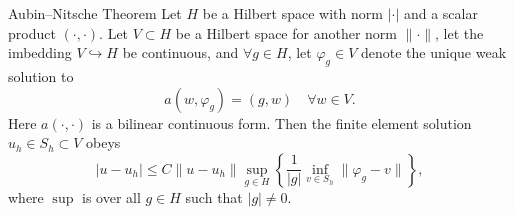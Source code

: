 \begin{thmx}{Aubin–Nitsche Theorem\label{thm:aubin-nitsche}}
    Let $H$ be a Hilbert space with norm $|\cdot|$ and a scalar product $(\cdot,\cdot)$.
    Let $V\subset H$ be a Hilbert space for another norm $\|\cdot\|$, let the imbedding
    $V \hookrightarrow H$ be continuous,
    and $\forall g \in H$, let $\varphi_g \in V$ denote the unique weak solution to 
    \begin{equation}
        a(w,\varphi_g) = (g,w) \quad \forall w\in V. \label{eq:aubin_nitsche_antagelse}
    \end{equation}
    Here $a(\cdot,\cdot)$ is a bilinear continuous form.
    Then the finite element solution $u_h\in S_h \subset V$ obeys
    \begin{equation*}
        |u-u_h| \leq C \|u-u_h\| \sup_{g\in H} \left \{ \frac{1}{|g|} \inf_{v \in S_h} \|\varphi_g - v\| \right \},
    \end{equation*}
    where $\sup$ is over all $g\in H$ such that $|g|\neq 0$.
\end{thmx}
